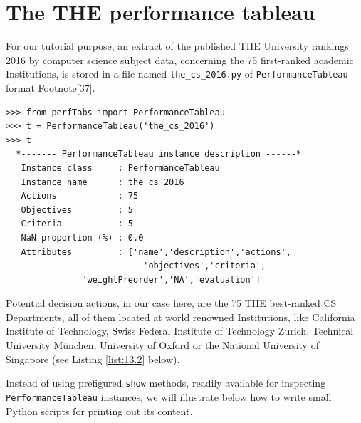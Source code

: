 \section{The THE performance tableau}
\label{sec:13.1}

For our tutorial purpose, an extract of the published THE University rankings 2016 by computer science subject data, concerning the 75 first-ranked academic Institutions, is stored in a file named \texttt{the\_cs\_2016.py} of \texttt{PerformanceTableau} format Footnote[37].

\begin{lstlisting}[caption={The 2016 THE World University Ranking by CS subject},label=list:13.1]
>>> from perfTabs import PerformanceTableau
>>> t = PerformanceTableau('the_cs_2016')
>>> t
  *------- PerformanceTableau instance description ------*
   Instance class     : PerformanceTableau
   Instance name      : the_cs_2016
   Actions            : 75
   Objectives         : 5
   Criteria           : 5
   NaN proportion (%) : 0.0
   Attributes         : ['name','description','actions',
                           'objectives','criteria',
			   'weightPreorder','NA','evaluation']
\end{lstlisting}

Potential decision actions, in our case here, are the 75 THE best-ranked CS Departments, all of them located at world renowned Institutions, like California Institute of Technology, Swiss Federal Institute of Technology Zurich, Technical University München, University of Oxford or the National University of Singapore (see Listing \ref{list:13.2} below). 

Instead of using prefigured \Digraph \texttt{show} methods, readily available for inspecting \texttt{PerformanceTableau} instances, we will illustrate below how to write small Python scripts for printing out its content.   

